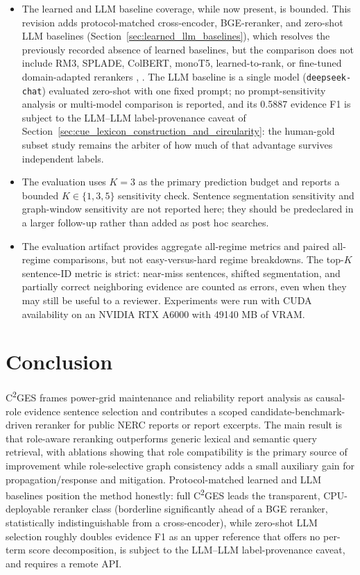 \documentclass{ieeeaccess}
\begin{document}
\begin{itemize}
  \item The learned and LLM baseline coverage, while now present, is bounded. This revision adds protocol-matched cross-encoder, BGE-reranker, and zero-shot LLM baselines (Section~\ref{sec:learned_llm_baselines}), which resolves the previously recorded absence of learned baselines, but the comparison does not include RM3, SPLADE, ColBERT, monoT5, learned-to-rank, or fine-tuned domain-adapted rerankers \cite{qin2024pairwise}, \cite{zhuang2024setwise}. The LLM baseline is a single model (\texttt{deepseek-chat}) evaluated zero-shot with one fixed prompt; no prompt-sensitivity analysis or multi-model comparison is reported, and its 0.5887 evidence F1 is subject to the LLM--LLM label-provenance caveat of Section~\ref{sec:cue_lexicon_construction_and_circularity}: the human-gold subset study remains the arbiter of how much of that advantage survives independent labels.
  \item The evaluation uses \(K=3\) as the primary prediction budget and reports a bounded \(K\in\{1,3,5\}\) sensitivity check. Sentence segmentation sensitivity and graph-window sensitivity are not reported here; they should be predeclared in a larger follow-up rather than added as post hoc searches.
  \item The evaluation artifact provides aggregate all-regime metrics and paired all-regime comparisons, but not easy-versus-hard regime breakdowns. The top-\(K\) sentence-ID metric is strict: near-miss sentences, shifted segmentation, and partially correct neighboring evidence are counted as errors, even when they may still be useful to a reviewer. Experiments were run with CUDA availability on an NVIDIA RTX A6000 with 49140 MB of VRAM.
\end{itemize}

\section{Conclusion}

\label{sec:conclusion}

C\textsuperscript{2}GES frames power-grid maintenance and reliability report analysis as causal-role evidence sentence selection and contributes a scoped candidate-benchmark-driven reranker for public NERC reports or report excerpts. The main result is that role-aware reranking outperforms generic lexical and semantic query retrieval, with ablations showing that role compatibility is the primary source of improvement while role-selective graph consistency adds a small auxiliary gain for propagation/response and mitigation. Protocol-matched learned and LLM baselines position the method honestly: full C\textsuperscript{2}GES leads the transparent, CPU-deployable reranker class (borderline significantly ahead of a BGE reranker, statistically indistinguishable from a cross-encoder), while zero-shot LLM selection roughly doubles evidence F1 as an upper reference that offers no per-term score decomposition, is subject to the LLM--LLM label-provenance caveat, and requires a remote API.
\end{document}
